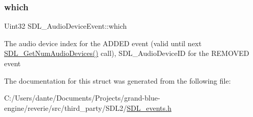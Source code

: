 \subsubsection{\texorpdfstring{which}{which}}
{\footnotesize\ttfamily Uint32 S\+D\+L\+\_\+\+Audio\+Device\+Event\+::which}

The audio device index for the A\+D\+D\+ED event (valid until next \mbox{\hyperlink{_s_d_l__audio_8h_ae165f64b3f0fecfebe1c97731600ca59}{S\+D\+L\+\_\+\+Get\+Num\+Audio\+Devices()}} call), S\+D\+L\+\_\+\+Audio\+Device\+ID for the R\+E\+M\+O\+V\+ED event 

The documentation for this struct was generated from the following file\+:\begin{DoxyCompactItemize}
\item 
C\+:/\+Users/dante/\+Documents/\+Projects/grand-\/blue-\/engine/reverie/src/third\+\_\+party/\+S\+D\+L2/\mbox{\hyperlink{_s_d_l__events_8h}{S\+D\+L\+\_\+events.\+h}}\end{DoxyCompactItemize}
